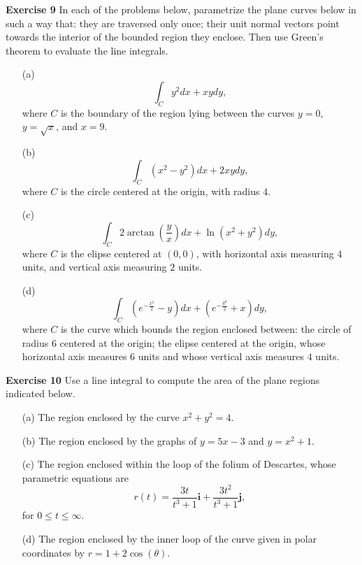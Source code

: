 \documentclass[12pt,oneside]{exam}
\newenvironment{exercise}[1]{\vspace{.1in}\noindent\textbf{Exercise #1 \hspace{.05em}}}{}
\begin{document}
\begin{exercise}{9}
In each of the problems below, parametrize the plane curves below in such a way that: they are traversed only once; their unit normal vectors point towards the interior of the bounded region they enclose. Then use Green's theorem to evaluate the line integrals. 

\begin{itemize}
\item[(a)] 
\begin{equation*}
\int_{C} y^2 dx + xy dy,
\end{equation*}
where $C$ is the boundary of the region lying between the curves $y=0$, $y=\sqrt{x}$, and $x=9$. 
\item[(b)] 
\begin{equation*}
\int_{C} (x^2-y^2)dx + 2xy dy, 
\end{equation*}
where $C$ is the circle centered at the origin, with radius $4$. 
\item[(c)] 
\begin{equation*}
\int_{C} 2\arctan\left(\frac{y}{x}\right) dx + \ln(x^2+y^2) dy, 
\end{equation*}
where $C$ is the elipse centered at $(0,0)$, with horizontal axis measuring $4$ units, and vertical axis measuring $2$ units. 
\item[(d)] 
\begin{equation*}
\int_{C} (e^{-\frac{x^2}{2}}-y) dx + (e^{-\frac{y^2}{2}} + x) dy, 
\end{equation*}
where $C$ is the curve which bounds the region enclosed between: the circle of radius $6$ centered at the origin; the elipse centered at the origin, whose horizontal axis measures $6$ units and whose vertical axis measures $4$ units. 
\end{itemize}
\end{exercise}

\begin{exercise}{10}
Use a line integral to compute the area of the plane regions indicated below. 
\begin{itemize}
\item[(a)] The region enclosed by the curve $x^2+y^2=4$. 
\item[(b)] The region enclosed by the graphs of $y=5x-3$ and $y=x^2+1$. 
\item[(c)] The region enclosed within the loop of the folium of Descartes, whose parametric equations are 
\begin{equation*}
r(t)=\frac{3t}{t^3+1}\textbf{i}+\frac{3t^2}{t^3+1}\textbf{j}, 
\end{equation*}
for $0 \leq t \leq \infty$. 
\item[(d)] The region enclosed by the inner loop of the curve given in polar coordinates by $r=1+2\cos(\theta)$. 
\end{itemize}
\end{exercise}
\end{document}
